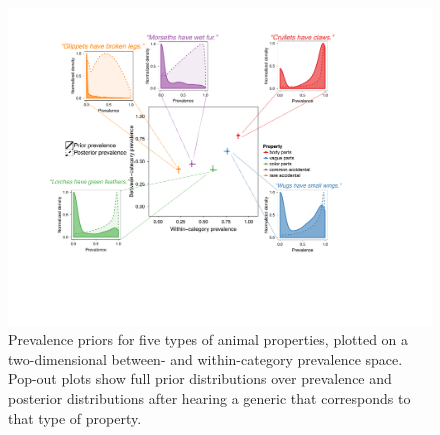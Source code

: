 \documentclass[10pt,letterpaper]{article}
\begin{document}
\begin{figure}
\centering
    \includegraphics[width=1\columnwidth]{prevalence-asymmetry-scatterwDists.pdf}
    \caption{Prevalence priors for five types of animal properties, plotted on a two-dimensional between- and within-category prevalence space. 
    Pop-out plots show full prior distributions over prevalence and posterior distributions after hearing a generic that corresponds to that type of property. }
  \label{fig:prior2}
\end{figure}
\end{document}
